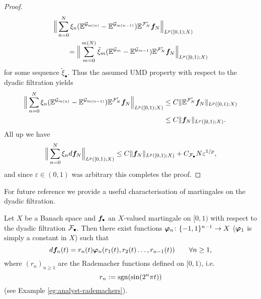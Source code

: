 \begin{proof}
\begin{equation*}
\begin{aligned}
      &\Big\| \sum_{n=0}^{N} \xi_{n} (\mathbb{E}^{\mathcal{G}_{m(n)}} - \mathbb{E}^{\mathcal{G}_{m(n-1)}}) \mathbb{E}^{\mathcal{F}'_{N}} \bm{f}_{N} \Big\|_{L^p([0,1);X)} \\
      &\qquad = \Big\| \sum_{m=0}^{m(N)} \tilde{\xi}_{m} (\mathbb{E}^{\mathcal{G}_{m}} - \mathbb{E}^{\mathcal{G}_{m-1}}) \mathbb{E}^{\mathcal{F}'_{N}} \bm{f}_{N} \Big\|_{L^p([0,1);X)}
    \end{aligned}
  \end{equation*}
  for some sequence $\tilde{\xi}_{\bullet}$.
  Thus the assumed UMD property with respect to the dyadic filtration yields
  \begin{equation*}
    \begin{aligned}
      \Big\| \sum_{n=0}^{N} \xi_{n} (\mathbb{E}^{\mathcal{G}_{m(n)}} - \mathbb{E}^{\mathcal{G}_{m(n-1)}}) \mathbb{E}^{\mathcal{F}'_{N}} \bm{f}_{N} \Big\|_{L^p([0,1);X)}
      &\leq C \|\mathbb{E}^{\mathcal{F}'_{N}} \bm{f}_{N}\|_{L^p([0,1);X)} \\
      &\leq C\|\bm{f}_{N}\|_{L^p([0,1);X)}.
    \end{aligned}
    \end{equation*}
    All up we have
    \begin{equation*}
      \Big\| \sum_{n=0}^{N} \xi_{n} d\bm{f}_{N} \Big\|_{L^p([0,1);X)} \leq C\|\bm{f}_{N}\|_{L^p([0,1);X)} + C_{\mathcal{F}_{\bullet}} N \varepsilon^{1/p},
    \end{equation*}
    and since $\varepsilon \in (0,1)$ was arbitrary this completes the proof.
  \end{proof}

  For future reference we provide a useful characterisation of martingales on the dyadic filtration.

  \begin{prop}\label{prop:PW-martingales}
    Let $X$ be a Banach space and $\bm{f}_{\bullet}$ an $X$-valued martingale on $[0,1)$ with respect to the dyadic filtration $\mathcal{F}_{\bullet}$.
    Then there exist functions $\bm{\varphi}_{n} \colon \{-1,1\}^{n-1} \to X$ ($\bm{\varphi}_{1}$ is simply a constant in $X$) such that
    \begin{equation*}
      d\bm{f}_{n}(t) = r_{n}(t) \bm{\varphi}_{n}(r_1(t), r_{2}(t)\ldots, r_{n-1}(t)) \qquad \forall n \geq 1,
    \end{equation*}
    where $(r_{n})_{n \geq 1}$ are the Rademacher functions defined on $[0,1)$, i.e.
    \begin{equation*}
      r_{n} := \operatorname{sgn}(\sin(2^n \pi t))
    \end{equation*}
    (see Example \ref{eg:analyst-rademachers}).
  \end{prop}

